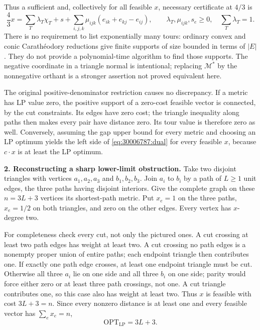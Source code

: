 \documentclass[11pt,a4paper]{article}
\numberwithin{equation}{section}
\begin{document}
Thus a sufficient and, collectively for all feasible $x$, necessary
certificate at $4/3$ is
\begin{equation}\label{eq:30006787:certificate}
 \frac43 x=\sum_T\lambda_T\chi_T+s+
       \sum_{i,j,k}\mu_{ijk}(e_{ik}+e_{kj}-e_{ij}),
 \qquad
 \lambda_T,\mu_{ijk},s_e\ge0,\quad\sum_T\lambda_T=1.
\end{equation}
There is no requirement to list exponentially many tours: ordinary
convex and conic Carath\'eodory reductions give finite supports of
size bounded in terms of $|E|$. They do not provide a polynomial-time
algorithm to find those supports. The negative coordinate in a triangle
normal is intentional; replacing $\mathcal M^*$ by the nonnegative
orthant is a stronger assertion not proved equivalent here.

The original positive-denominator restriction causes no discrepancy.
If a metric has LP value zero, the positive support of a zero-cost
feasible vector is connected, by the cut constraints. Its edges have
zero cost; the triangle inequality along paths then makes every pair
have distance zero. Its tour value is therefore zero as well.
Conversely, assuming the gap upper bound for every metric and choosing
an LP optimum yields the left side of \eqref{eq:30006787:dual} for every
feasible $x$, because $c\cdot x$ is at least the LP optimum.

\textbf{2. Reconstructing a sharp lower-limit obstruction.}
Take two disjoint triangles with vertices $a_1,a_2,a_3$ and
$b_1,b_2,b_3$. Join $a_i$ to $b_i$ by a path of $L\ge1$ unit edges,
the three paths having disjoint interiors. Give the complete graph on
these $n=3L+3$ vertices its shortest-path metric. Put $x_e=1$ on the
three paths, $x_e=1/2$ on both triangles, and zero on the other edges.
Every vertex has $x$-degree two.

For completeness check every cut, not only the pictured ones. A cut
crossing at least two path edges has weight at least two. A cut crossing
no path edges is a nonempty proper union of entire paths; each endpoint
triangle then contributes one. If exactly one path edge crosses, at
least one endpoint triangle must be cut. Otherwise all three $a_i$
lie on one side and all three $b_i$ on one side; parity would force
either zero or at least three path crossings, not one. A cut triangle
contributes one, so this case also has weight at least two.
Thus $x$ is feasible with cost $3L+3=n$. Since every nonzero distance
is at least one and every feasible vector has $\sum_e x_e=n$,
\begin{equation}\label{eq:30006787:lowerlp}
                         \mathrm{OPT}_{\mathrm{LP}}=3L+3.
\end{equation}
\end{document}
